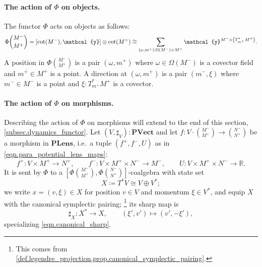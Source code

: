 \documentclass[11pt, oneside, article]{memoir}
\theoremstyle{definition}
\theoremstyle{plain}
\DeclarePairedDelimiter{\ihom}{[}{]}
\newcommand{\Cat}[1]{\mathbf{#1}}%
\newcommand{\rr}{\mathbb{R}}
\newcommand{\yon}{\mathcal{y}}
\newcommand{\potlens}{\Cat{PLens}}
\newcommand{\pvect}{\Cat{PVect}}
\newcommand{\inpt}[1]{#1^{-}}
\newcommand{\outp}[1]{#1^{+}}
\newcommand{\lensob}[1]{\binom{\inpt{#1}}{\outp{#1}}}%
\begin{document}
\paragraph{The action of $\Phi$ on objects.}
The functor $\Phi$ acts on objects as follows:
\begin{equation}\label{eqn.Phi_on_obs}
\Phi\lensob M=
\ihom{\cot{\inpt M},\yon}\otimes\cot{\outp M}\cong
\sum_{(\omega,\outp m):\Omega(\inpt M)\times\outp M}\yon^{\inpt M\times\left(T^*_{\outp{m}}\outp M\right)}.
\end{equation}
A position in $\Phi\lensob M$ is a pair $(\omega,\outp m)$ where $\omega\in\Omega(\inpt M)$ is a covector field and $\outp m\in\outp{M}$ is a point. A direction at $(\omega,\outp m)$ is a pair $(\inpt m,\xi)$ where $\inpt m\in\inpt M$ is a point and $\xi:T^*_{\outp{m}}\outp M$ is a covector.

\paragraph{The action of $\Phi$ on morphisms.}
Describing the action of $\Phi$ on morphisms will extend to the end of this section, \cref{subsec.dynamics_functor}. Let $(V,\sharp_V):\pvect$ and let
$f\colon V\cdot\lensob M\to\lensob N$
be a morphism in $\potlens$, i.e.\ a tuple $(\outp f,\inpt f,U)$ as in \eqref{eqn.para_potential_lens_maps}:
\begin{equation}\label{eqn.para_potential_lens_maps}
\outp f\colon V\times\outp M\to\outp N,\qquad
\inpt f\colon V\times\outp M\times\inpt N\to\inpt M,\qquad
U\colon V\times\outp M\times\inpt N\to\rr.
\end{equation}
It is sent by $\Phi$ to a $[\Phi\lensob M,\Phi\lensob N]$-coalgebra with state set
\begin{equation}\label{eqn.state_space}
X\coloneqq T^*V\cong V\oplus V^*;
\end{equation}
we write $x=(v,\xi)\in X$ for position $v\in V$ and momentum $\xi\in V^*$, and equip $X$ with the canonical symplectic pairing;%
\footnote{This comes from \cref{def.legendre_projection,prop.canonical_symplectic_pairing}.}
its sharp map is
\begin{equation}\label{eqn.sharp_X}
\sharp_X\colon X^*\to X,\qquad (\xi',v')\mapsto(v',-\xi'),
\end{equation}
specializing \eqref{eqn.canonical_sharp}.
\end{document}

